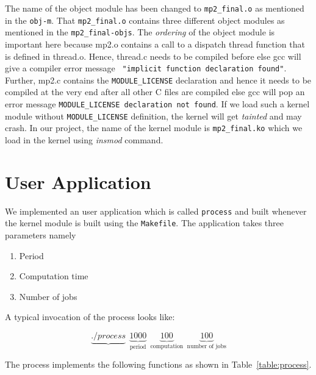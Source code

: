 \documentclass[11pt]{article}
\begin{document}
The name of the object module has been changed to {\tt mp2\_final.o} as mentioned in the {\tt obj-m}. That {\tt mp2\_final.o} contains three different object modules as mentioned in the {\tt mp2\_final-objs}. The {\em ordering} of the object module is important here because mp2.o contains a call to a dispatch thread function that is defined in thread.o. Hence, thread.c needs to be compiled before else gcc will give a compiler error message {\tt
"implicit function declaration found"}. Further, mp2.c contains the {\tt MODULE\_LICENSE} declaration and hence it needs to be compiled at the very end after all other C files are compiled else gcc will pop an error message {\tt MODULE\_LICENSE declaration not found}. If we load such a kernel module without {\tt MODULE\_LICENSE} definition, the kernel will get {\em tainted} and may crash. In our project, the name of the kernel module is {\tt mp2\_final.ko} which we load in the kernel using {\em insmod} command.

\nopagebreak



%


\section{User Application}

We implemented an user application which is called {\tt process} and built whenever the kernel module is built using the {\tt Makefile}.  The application takes three parameters namely
\begin{enumerate}
	\item Period
	\item Computation time
	\item Number of jobs
\end{enumerate}
A typical invocation of the process looks like:

\[\underbrace{./process}~~\underbrace{1000}_{\text{period}}~~\underbrace{100}_{\text{computation}} ~~\underbrace{100}_{\text{number of jobs}}\]

The process implements the following functions as shown in Table~\ref{table:process}.
\end{document}
